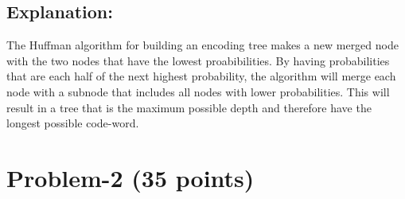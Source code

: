 \documentclass[11pt]{article}
\begin{document}
\subsection*{Explanation:}
The Huffman algorithm for building an encoding tree makes a new merged node with the two nodes that have the lowest proabibilities.
By having probabilities that are each half of the next highest probability, the algorithm will merge each node with a subnode that includes all nodes with lower probabilities.
This will result in a tree that is the maximum possible depth and therefore have the longest possible code-word.

\newpage
\section*{Problem-2 (35 points)}
\end{document}
